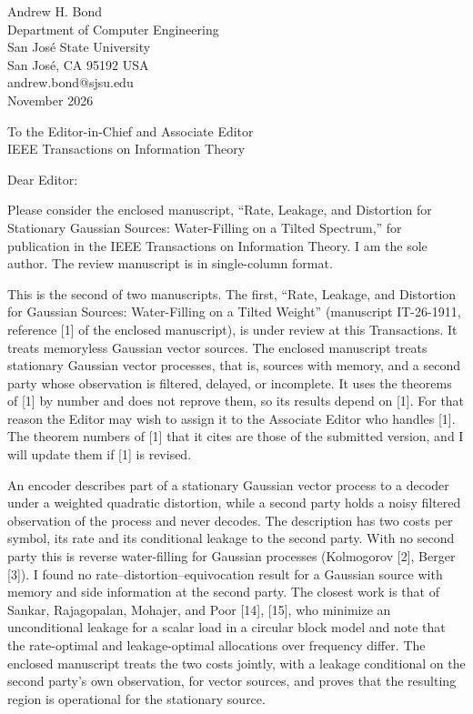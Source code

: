 \documentclass[11pt]{article}
\begin{document}
\begin{flushright}
Andrew H. Bond\\
Department of Computer Engineering\\
San Jos\'e State University\\
San Jos\'e, CA 95192 USA\\
andrew.bond@sjsu.edu\\[0.8em]
November 2026
\end{flushright}

To the Editor-in-Chief and Associate Editor\\
IEEE Transactions on Information Theory

Dear Editor:

Please consider the enclosed manuscript, ``Rate, Leakage, and Distortion
for Stationary Gaussian Sources: Water-Filling on a Tilted Spectrum,''
for publication in the IEEE Transactions on Information Theory. I am the
sole author. The review manuscript is in single-column format.

This is the second of two manuscripts. The first, ``Rate, Leakage, and
Distortion for Gaussian Sources: Water-Filling on a Tilted Weight''
(manuscript IT-26-1911, reference [1] of the enclosed manuscript),
is under review at this Transactions. It treats memoryless Gaussian
vector sources. The enclosed manuscript treats stationary Gaussian
vector processes, that is, sources with memory, and a second party
whose observation is filtered, delayed, or incomplete. It uses the
theorems of [1] by number and does not reprove them, so its results
depend on [1].
For that reason the Editor may wish to assign it to the Associate
Editor who handles [1]. The theorem numbers of [1] that it cites are
those of the submitted version, and I will update them if [1] is
revised.

An encoder describes part of a stationary Gaussian vector process to a
decoder under a weighted quadratic distortion, while a second party
holds a noisy filtered observation of the process and never decodes. The
description has two costs per symbol, its rate and its conditional
leakage to the second party. With no second party this is reverse
water-filling for Gaussian processes (Kolmogorov [2], Berger [3]). I
found no rate--distortion--equivocation result for a Gaussian source
with memory and side information at the second party. The closest work
is that of Sankar, Rajagopalan, Mohajer, and Poor [14], [15], who
minimize an unconditional leakage for a scalar load in a circular block
model and note that the rate-optimal and leakage-optimal allocations
over frequency differ. The enclosed manuscript treats the two costs
jointly, with a leakage conditional on the second party's own
observation, for vector sources, and proves that the resulting region is
operational for the stationary source.
\end{document}
